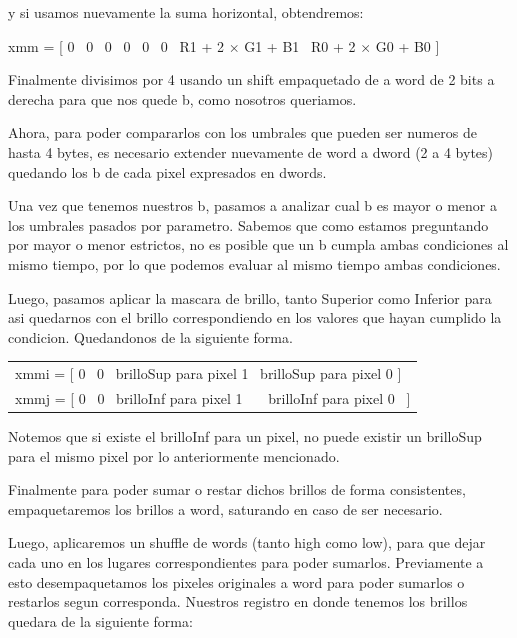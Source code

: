 \documentclass[a4paper]{article}
\begin{document}
y si usamos nuevamente la suma horizontal, obtendremos:

\begin{center}
	xmm = [ 0 \textpipe\ 0 \textpipe\ 0 \textpipe\ 0 \textpipe\ 0 \textpipe\ 0 \textpipe\ R1 + 2 $\times$ G1 + B1 \textpipe\ R0 + 2 $\times$ G0 + B0 ]
\end{center}

Finalmente divisimos por 4 usando un shift empaquetado de a word de 2 bits a derecha para que nos quede b, como nosotros queriamos.

Ahora, para poder compararlos con los umbrales que pueden ser numeros de hasta 4 bytes, es necesario extender nuevamente de word a dword (2 a 4 bytes) quedando los b de cada pixel expresados en dwords.

Una vez que tenemos nuestros b, pasamos a analizar cual b es mayor o menor a los umbrales pasados por parametro. Sabemos que como estamos preguntando por mayor o menor estrictos, no es posible que un b cumpla ambas condiciones al mismo tiempo, por lo que podemos evaluar al mismo tiempo ambas condiciones.

Luego, pasamos aplicar la mascara de brillo, tanto Superior como Inferior para asi quedarnos con el brillo correspondiendo en los valores que hayan cumplido la condicion. Quedandonos de la siguiente forma.

\begin{center}
	\begin{tabular}{l}
		xmmi = [ 0 \textpipe\ 0 \textpipe\ brilloSup para pixel 1 \textpipe\ brilloSup para pixel 0 ]\\
		xmmj = [ 0 \textpipe\ 0 \textpipe\ brilloInf para pixel 1 \ \ \textpipe\ brilloInf para pixel 0 \ ]
	\end{tabular}
	
\end{center}

Notemos que si existe el brilloInf para un pixel, no puede existir un brilloSup para el mismo pixel por lo anteriormente mencionado.

Finalmente para poder sumar o restar dichos brillos de forma consistentes, empaquetaremos los brillos a word, saturando en caso de ser necesario.

Luego, aplicaremos un shuffle de words (tanto high como low), para que dejar cada uno en los lugares correspondientes para poder sumarlos. Previamente a esto desempaquetamos los pixeles originales a word para poder sumarlos o restarlos segun corresponda. Nuestros registro en donde tenemos los brillos quedara de la siguiente forma:
\end{document}
